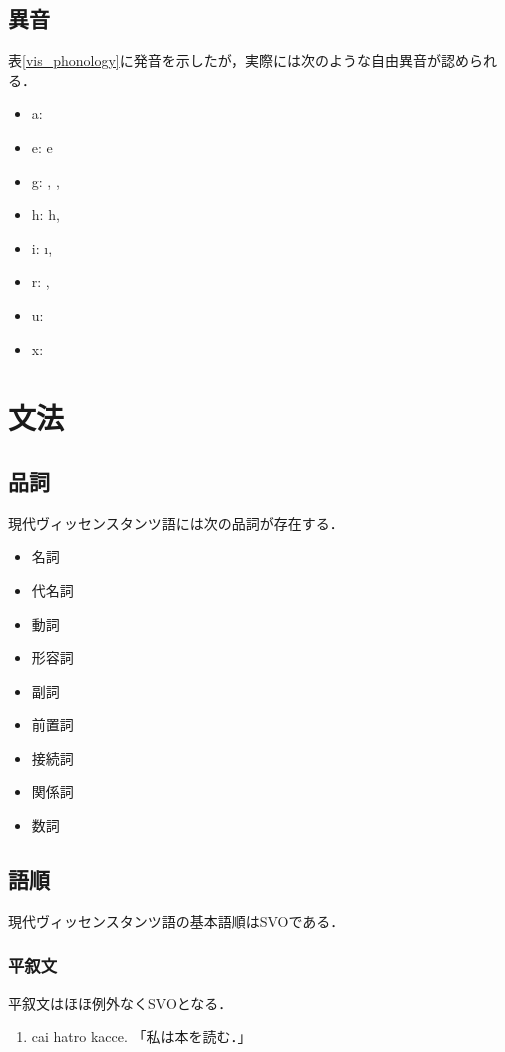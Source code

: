 \documentclass[a4paper,xelatex,ja=standard]{bxjsarticle}
\begin{document}
\subsection{異音}
表\ref{vis_phonology}に発音を示したが，実際には次のような自由異音が認められる．
\begin{itemize}
 \item a: {\charis \textscripta}
 \item e: {\charis e}
 \item g: {\charis \textgamma, \textinvscr, \textscr}
 \item h: {\charis h,\textchi}
 \item i: {\charis \i, \textbari}
 \item r: {\charis \textfishhookr, \textturnr}
 \item u: {\charis \textbaru}
 \item x: {\charis \textctc}
\end{itemize}

\section{文法}
\subsection{品詞}
現代ヴィッセンスタンツ語には次の品詞が存在する．
\begin{itemize}
 \item 名詞
 \item 代名詞
 \item 動詞
 \item 形容詞
 \item 副詞
 \item 前置詞
 \item 接続詞
 \item 関係詞
 \item 数詞
\end{itemize}

\subsection{語順}
現代ヴィッセンスタンツ語の基本語順はSVOである．

\subsubsection{平叙文}
平叙文はほほ例外なくSVOとなる．
\begin{enumerate}
 \item cai hatro kacce. 「私は本を読む．」 
\end{enumerate}
\end{document}
